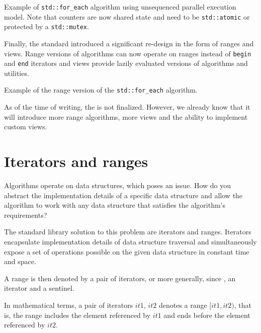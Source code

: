 \begin{box-note}
\footnotesize Example of \texttt{std::for_each} algorithm using unsequenced parallel execution model. Note that counters are now shared state and need to be \texttt{std::atomic} or protected by a \texttt{std::mutex}.
\tcblower
{}
\end{box-note}

Finally, the  standard introduced a significant re-design in the form of ranges and views. Range versions of algorithms can now operate on ranges instead of \texttt{begin} and \texttt{end} iterators and views provide lazily evaluated versions of algorithms and utilities.

\begin{box-note}
\footnotesize Example of the range version of the \texttt{std::for_each} algorithm.
\tcblower
{}
\end{box-note}

As of the time of writing, the  is not finalized. However, we already know that it will introduce more range algorithms, more views and the ability to implement custom views.

\section{Iterators and ranges}

Algorithms operate on data structures, which poses an issue. How do you abstract the implementation details of a specific data structure and allow the algorithm to work with any data structure that satisfies the algorithm's requirements?

The \CC standard library solution to this problem are iterators and ranges. Iterators encapsulate implementation details of data structure traversal and simultaneously expose a set of operations possible on the given data structure in constant time and space.

A range is then denoted by a pair of iterators, or more generally, since , an iterator and a sentinel.

In mathematical terms, a pair of iterators $it1$, $it2$ denotes a range $[it1, it2)$, that is, the range includes the element referenced by $it1$ and ends before the element referenced by $it2$.



